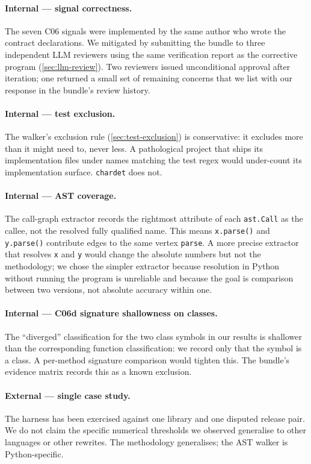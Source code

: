 \documentclass[11pt,letterpaper]{article}
\begin{document}
\paragraph{Internal --- signal correctness.} The seven C06 signals
were implemented by the same author who wrote the contract
declarations. We mitigated by submitting the bundle to three
independent LLM reviewers using the same verification report as
the corrective program (\cref{sec:llm-review}). Two reviewers issued
unconditional approval after iteration; one returned a small set of
remaining concerns that we list with our response in the bundle's
review history.

\paragraph{Internal --- test exclusion.} The walker's exclusion rule
(\cref{sec:test-exclusion}) is conservative: it excludes more than
it might need to, never less. A pathological project that ships its
implementation files under names matching the test regex would
under-count its implementation surface. \texttt{chardet} does not.

\paragraph{Internal --- AST coverage.} The call-graph extractor
records the rightmost attribute of each \texttt{ast.Call} as the
callee, not the resolved fully qualified name. This means
\texttt{x.parse()} and \texttt{y.parse()} contribute edges to the
same vertex \texttt{parse}. A more precise extractor that resolves
\texttt{x} and \texttt{y} would change the absolute numbers but not
the methodology; we chose the simpler extractor because resolution
in Python without running the program is unreliable and because the
goal is comparison between two versions, not absolute accuracy
within one.

\paragraph{Internal --- C06d signature shallowness on classes.} The
``diverged'' classification for the two class symbols in our results
is shallower than the corresponding function classification: we
record only that the symbol is a class. A per-method signature
comparison would tighten this. The bundle's evidence matrix records
this as a known exclusion.

\paragraph{External --- single case study.} The harness has been
exercised against one library and one disputed release pair. We do
not claim the specific numerical thresholds we observed generalise
to other languages or other rewrites. The methodology generalises;
the AST walker is Python-specific.
\end{document}
